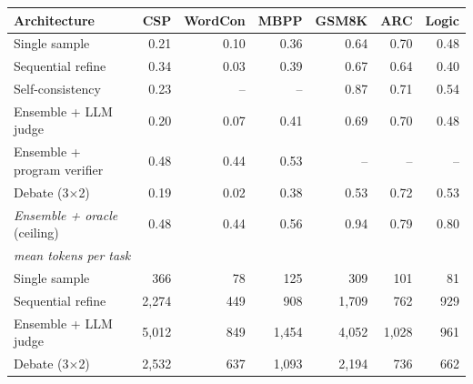 \begin{tabular}{lrrrrrr}
\toprule
Architecture & CSP & WordCon & MBPP & GSM8K & ARC & Logic \\
\midrule
Single sample & 0.21 & 0.10 & 0.36 & 0.64 & 0.70 & 0.48 \\
Sequential refine & 0.34 & 0.03 & 0.39 & 0.67 & 0.64 & 0.40 \\
Self-consistency & 0.23 & -- & -- & 0.87 & 0.71 & 0.54 \\
Ensemble + LLM judge & 0.20 & 0.07 & 0.41 & 0.69 & 0.70 & 0.48 \\
Ensemble + program verifier & 0.48 & 0.44 & 0.53 & -- & -- & -- \\
Debate (3$\times$2) & 0.19 & 0.02 & 0.38 & 0.53 & 0.72 & 0.53 \\
\midrule
\textit{Ensemble + oracle} (ceiling) & 0.48 & 0.44 & 0.56 & 0.94 & 0.79 & 0.80 \\
\midrule
\multicolumn{7}{l}{\textit{mean tokens per task}} \\
\quad Single sample & 366 & 78 & 125 & 309 & 101 & 81 \\
\quad Sequential refine & 2,274 & 449 & 908 & 1,709 & 762 & 929 \\
\quad Ensemble + LLM judge & 5,012 & 849 & 1,454 & 4,052 & 1,028 & 961 \\
\quad Debate (3$\times$2) & 2,532 & 637 & 1,093 & 2,194 & 736 & 662 \\
\bottomrule
\end{tabular}